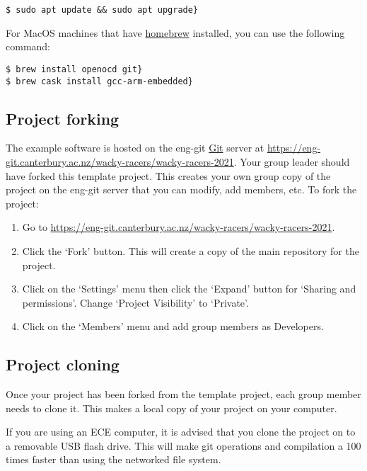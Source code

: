 \begin{verbatim}
$ sudo apt update && sudo apt upgrade}
\end{verbatim}

For MacOS machines that have \href{https://brew.sh}{homebrew} installed,
you can use the following command:

\begin{verbatim}
$ brew install openocd git}
$ brew cask install gcc-arm-embedded}
\end{verbatim}

\subsection{Project forking}
\label{project-forking}

The example software is hosted on the eng-git \url{Git} server at
\href{https://eng-git.canterbury.ac.nz/wacky-racers/wacky-racers-2021}{\url{https://eng-git.canterbury.ac.nz/wacky-racers/wacky-racers-2021}}.
Your group leader should have forked this template project. This creates
your own group copy of the project on the eng-git server that you can
modify, add members, etc. To fork the project:

\begin{enumerate}
\item
  Go to
  \href{https://eng-git.canterbury.ac.nz/wacky-racers/wacky-racers-2021}{\url{https://eng-git.canterbury.ac.nz/wacky-racers/wacky-racers-2021}}.
\item
  Click the `Fork' button. This will create a copy of the main repository
  for the project.
\item
  Click on the `Settings' menu then click the `Expand' button for
  `Sharing and permissions'. Change `Project Visibility' to `Private'.
\item
  Click on the `Members' menu and add group members as Developers.
\end{enumerate}

\subsection{Project cloning}
\label{project-cloning}

Once your project has been forked from the template project, each group
member needs to clone it. This makes a local copy of your project on
your computer. 

If you are using an ECE computer, it is advised that you clone the
project on to a removable USB flash drive. This will make git operations
and compilation a 100 times faster than using the networked file system.

